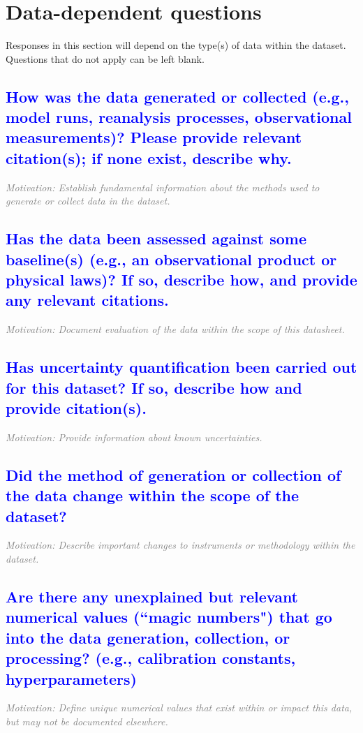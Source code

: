 \documentclass[letterpaper, 10 pt, transmag]{IEEEtran}
\begin{document}
\section{Data-dependent questions}
Responses in this section will depend on the type(s) of data within the dataset. Questions that do not apply can be left blank.


\textcolor{blue}{\subsection{How was the data generated or collected (e.g., model runs, reanalysis processes, observational measurements)? Please provide relevant citation(s); if none exist, describe why.}}
\textcolor{gray}{\textit{Motivation: Establish fundamental information about the methods used to generate or collect data in the dataset.}}

\textcolor{blue}{\subsection{Has the data been assessed against some baseline(s) (e.g., an observational product or physical laws)? If so, describe how, and provide any relevant citations.}}
\textcolor{gray}{\textit{Motivation: Document evaluation of the data within the scope of this datasheet.}}

\textcolor{blue}{\subsection{Has uncertainty quantification been carried out for this dataset? If so, describe how and provide citation(s).}}
\textcolor{gray}{\textit{Motivation: Provide information about known uncertainties.}}

\textcolor{blue}{\subsection{Did the method of generation or collection of the data change within the scope of the dataset?}}
\textcolor{gray}{\textit{Motivation: Describe important changes to instruments or methodology within the dataset.}}

\textcolor{blue}{\subsection{Are there any unexplained but relevant numerical values (``magic numbers") that go into the data generation, collection, or processing? (e.g., calibration constants, hyperparameters)}}
\textcolor{gray}{\textit{Motivation: Define unique numerical values that exist within or impact this data, but may not be documented elsewhere.}}
\end{document}
